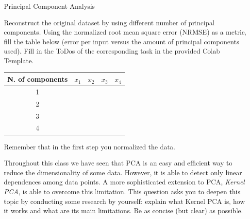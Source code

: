 \documentclass[
	english,
        solution=true
	]{tudaexercise}
\begin{document}
\begin{task}[points=28]{Principal Component Analysis}
\begin{subtask}[points=6, title=Low Dimensional Space]
\begin{solution}

\end{solution}

\end{subtask}



\begin{subtask}[points=6, title=Projection to the Original Space]
Reconstruct the original dataset by using different number of principal components. Using the normalized root mean square error (NRMSE) as a metric, fill the table below (error per input versus the amount of principal components used). Fill in the ToDos of the corresponding task in the provided Colab Template.

\begin{tabular}{c|r|r|r|r}
N. of components & $x_1$ & $x_2$ & $x_3$ & $x_4$ \\
\hline
1 & & & & \\
2 & & & & \\
3 & & & & \\
4 & & & &
\end{tabular}

Remember that in the first step you normalized the data.

\begin{solution}

\end{solution}
\end{subtask}

\newpage

\begin{subtask}[points=5, title=Kernel PCA]
Throughout this class we have seen that PCA is an easy and efficient way to reduce the dimensionality of some data. However, it is able to detect only linear dependences among data points. A more sophisticated extension to PCA, \emph{Kernel PCA}, is able to overcome this limitation. 
This question asks you to deepen this topic by conducting some research by yourself: explain what Kernel PCA is, how it works and what are its main limitations. Be as concise (but clear) as possible.

\begin{solution}

\end{solution}
\end{subtask}
\end{task}
\end{document}
